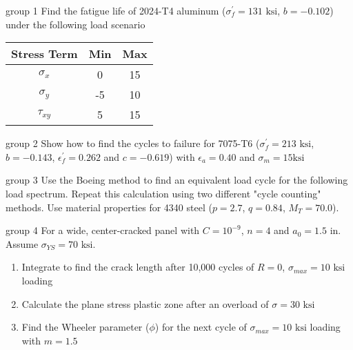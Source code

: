 \documentclass[10pt]{beamer}
\begin{document}
	\begin{frame}{group 1}
		Find the fatigue life of 2024-T4 aluminum ($\sigma_f^\prime = 131 \text{ ksi}$, $b = -0.102$) under the following load scenario
		\begin{table}
		\begin{tabular}{ccc}
			\hline Stress Term & Min & Max \\ 
			\hline $\sigma_x$ & 0 & 15 \\ 
			$\sigma_y$ & -5 & 10 \\ 
			$\tau_{xy}$ & 5 & 15 \\ 
			\hline 
		\end{tabular} 
	\end{table}
	\end{frame}
	
	\begin{frame}{group 2}
		Show how to find the cycles to failure for 7075-T6 ($\sigma_f^\prime = 213 \text{ ksi}$, $b=-0.143$, $\epsilon_f^\prime = 0.262$ and $c=-0.619$) with $\epsilon_a = 0.40$ and $\sigma_m = 15 \text{ksi}$
	\end{frame}
	
	\begin{frame}{group 3}
		Use the Boeing method to find an equivalent load cycle for the following load spectrum.
		Repeat this calculation using two different "cycle counting" methods.
		Use material properties for 4340 steel ($p=2.7$, $q=0.84$, $M_T = 70.0$).
		\begin{figure}[H]
			\centering
		\end{figure}
	\end{frame}
	
	\begin{frame}{group 4}
		For a wide, center-cracked panel with $C=10^{-9}$, $n=4$ and $a_0 = 1.5 \text{ in}$. Assume $\sigma_{YS} = 70 \text{ ksi}$.
		\begin{enumerate}
			\item Integrate to find the crack length after 10,000 cycles of $R=0$, $\sigma_{max} = 10 \text{ ksi}$ loading
			\item Calculate the plane stress plastic zone after an overload of $\sigma = 30 \text{ ksi}$
			\item Find the Wheeler parameter ($\phi$) for the next cycle of $\sigma_{max} = 10 \text{ ksi}$ loading with $m=1.5$
		\end{enumerate}
	\end{frame}
\end{document}
